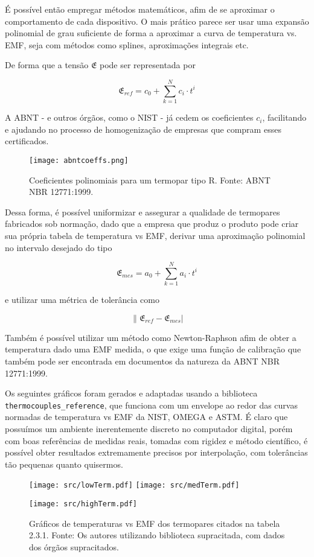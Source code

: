 \documentclass[a4paper,12pt]{report}
\begin{document}
	É possível então empregar métodos matemáticos, afim de se aproximar o comportamento de cada dispositivo. O mais prático parece ser usar uma expansão polinomial de grau suficiente de forma a aproximar a curva de temperatura vs. EMF, seja com métodos como splines, aproximações integrais etc.

	De forma que a tensão $\mathfrak{E}$ pode ser representada por
	
	\[\mathfrak{E}_{ref} = c_{0} + \sum_{k = 1}^{N}c_{i} \cdot t^{i}\]
	
	A ABNT - e outros órgãos, como o NIST - já cedem os coeficientes $c_{i}$, facilitando e ajudando no processo de homogenização de empresas que compram esses certificados.
	
		\begin{figure}[H]
		\centering
		\texttt{[image: abntcoeffs.png]}\\
		\caption{Coeficientes polinomiais para um termopar tipo R. Fonte: ABNT NBR 12771:1999.}
	\end{figure}

	Dessa forma, é possível uniformizar e assegurar a qualidade de termopares fabricados sob normação, dado que a empresa que produz o produto pode criar sua própria tabela de temperatura vs EMF, derivar uma aproximação polinomial no intervalo desejado do tipo
	
	\[\mathfrak{E}_{mes} = a_{0} + \sum_{k = 1}^{N}a_{i} \cdot t^{i}\]
	
	e utilizar uma métrica de tolerância como
	
	\[\|\mathfrak{E}_{ref} - \mathfrak{E}_{mes}|\] 
	
	Também é possível utilizar um método como Newton-Raphson afim de obter a temperatura dado uma EMF medida, o que exige uma função de calibração que também pode ser encontrada em documentos da natureza da ABNT NBR 12771:1999.
	
	Os seguintes gráficos foram gerados e adaptadas usando a biblioteca \texttt{thermocouples\_reference}, que funciona com um envelope ao redor das curvas normadas de temperatura vs EMF da NIST, OMEGA e ASTM. É claro que possuímos um ambiente inerentemente discreto no computador digital, porém com boas referências de medidas reais, tomadas com rigidez e método científico, é possível obter resultados extremamente precisos por interpolação, com tolerâncias tão pequenas quanto quisermos.

	\begin{figure}[htbp]
	\texttt{[image: src/lowTerm.pdf]}
	\texttt{[image: src/medTerm.pdf]}
	\begin{center}
		\texttt{[image: src/highTerm.pdf]}
		
		\caption{Gráficos de temperaturas vs EMF dos termopares citados na tabela 2.3.1. Fonte: Os autores utilizando biblioteca supracitada, com dados dos órgãos supracitados.}
	\end{center}
	\end{figure}
\end{document}
